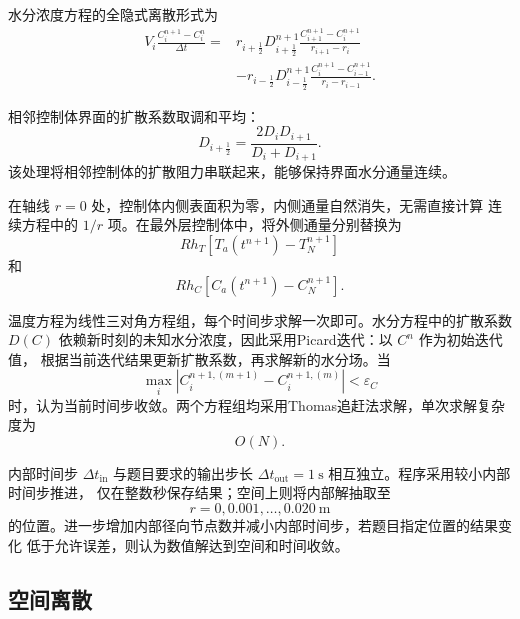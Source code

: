 \documentclass[12pt,a4paper]{article}
\begin{document}
水分浓度方程的全隐式离散形式为
\begin{equation}
\begin{aligned}
V_i\frac{C_i^{n+1}-C_i^n}{\Delta t}
={}&r_{i+\frac12}D_{i+\frac12}^{n+1}
\frac{C_{i+1}^{n+1}-C_i^{n+1}}{r_{i+1}-r_i}\\
&-r_{i-\frac12}D_{i-\frac12}^{n+1}
\frac{C_i^{n+1}-C_{i-1}^{n+1}}{r_i-r_{i-1}}.
\end{aligned}
\label{eq:merged-q1-moisture-fvm}
\end{equation}

相邻控制体界面的扩散系数取调和平均：
\begin{equation}
D_{i+\frac12}=\frac{2D_iD_{i+1}}{D_i+D_{i+1}}.
\label{eq:merged-q1-harmonic}
\end{equation}
该处理将相邻控制体的扩散阻力串联起来，能够保持界面水分通量连续。

在轴线 $r=0$ 处，控制体内侧表面积为零，内侧通量自然消失，无需直接计算
连续方程中的 $1/r$ 项。在最外层控制体中，将外侧通量分别替换为
\begin{equation}
Rh_T\left[T_a(t^{n+1})-T_N^{n+1}\right]
\end{equation}
和
\begin{equation}
Rh_C\left[C_a(t^{n+1})-C_N^{n+1}\right].
\end{equation}

温度方程为线性三对角方程组，每个时间步求解一次即可。水分方程中的扩散系数
$D(C)$ 依赖新时刻的未知水分浓度，因此采用Picard迭代：以 $C^n$ 作为初始迭代值，
根据当前迭代结果更新扩散系数，再求解新的水分场。当
\begin{equation}
\max_i\left|C_i^{n+1,(m+1)}-C_i^{n+1,(m)}\right|<\varepsilon_C
\end{equation}
时，认为当前时间步收敛。两个方程组均采用Thomas追赶法求解，单次求解复杂度为
\begin{equation}
O(N).
\end{equation}

内部时间步 $\Delta t_{\mathrm{in}}$ 与题目要求的输出步长
$\Delta t_{\mathrm{out}}=1\ \mathrm{s}$ 相互独立。程序采用较小内部时间步推进，
仅在整数秒保存结果；空间上则将内部解抽取至
\begin{equation}
r=0,0.001,\ldots,0.020\ \mathrm{m}
\end{equation}
的位置。进一步增加内部径向节点数并减小内部时间步，若题目指定位置的结果变化
低于允许误差，则认为数值解达到空间和时间收敛。

\subsection{空间离散}
\end{document}
